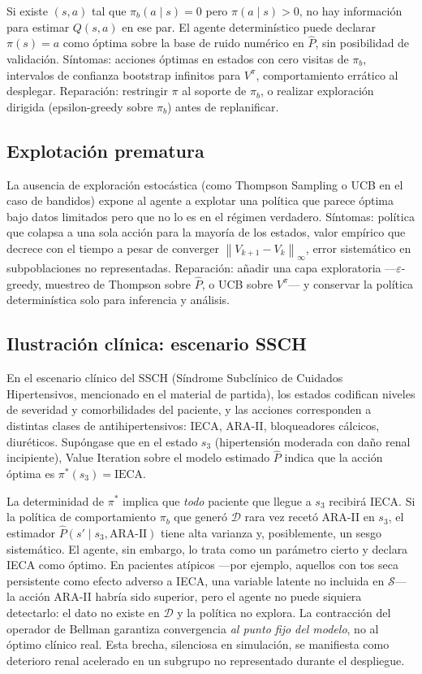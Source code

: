 \documentclass[12pt, a4paper]{article}
\theoremstyle{plain}
\theoremstyle{definition}
\newcommand{\cS}{\mathcal{S}}
\newcommand{\Vpi}{V^{\pi}}
\newcommand{\norminf}[1]{\left\|#1\right\|_{\infty}}
\newcommand{\pibeh}{\pi_b}
\newcommand{\Phat}{\widehat{P}}
\begin{document}
Si existe $(s,a)$ tal que $\pibeh(a\mid s)=0$ pero $\pi(a\mid s)>0$,
no hay información para estimar $Q(s,a)$ en ese par. El agente
determinístico puede declarar $\pi(s)=a$ como óptima sobre la base de
ruido numérico en $\Phat$, sin posibilidad de validación. Síntomas:
acciones óptimas en estados con cero visitas de $\pibeh$, intervalos de
confianza bootstrap infinitos para $V^{\pi}$, comportamiento errático al
desplegar. Reparación: restringir $\pi$ al soporte de $\pibeh$, o
realizar exploración dirigida (epsilon-greedy sobre $\pibeh$) antes de
replanificar.

\subsection{Explotación prematura}

La ausencia de exploración estocástica (como Thompson Sampling o UCB en
el caso de bandidos) expone al agente a explotar una política que parece
óptima bajo datos limitados pero que no lo es en el régimen verdadero.
Síntomas: política que colapsa a una sola acción para la mayoría de los
estados, valor empírico que decrece con el tiempo a pesar de converger
$\norminf{V_{k+1}-V_k}$, error sistemático en subpoblaciones no
representadas. Reparación: añadir una capa exploratoria ---$\varepsilon$-greedy,
muestreo de Thompson sobre $\Phat$, o UCB sobre $\Vpi$--- y conservar la
política determinística solo para inferencia y análisis.

\subsection{Ilustración clínica: escenario SSCH}

En el escenario clínico del SSCH (Síndrome Subclínico de Cuidados
Hipertensivos, mencionado en el material de partida), los estados
codifican niveles de severidad y comorbilidades del paciente, y las
acciones corresponden a distintas clases de antihipertensivos: IECA,
ARA-II, bloqueadores cálcicos, diuréticos. Supóngase que en el estado
$s_3$ (hipertensión moderada con daño renal incipiente), Value Iteration
sobre el modelo estimado $\Phat$ indica que la acción óptima es
$\pi^{*}(s_3)=\text{IECA}$.

La determinidad de $\pi^{*}$ implica que \emph{todo} paciente que llegue a
$s_3$ recibirá IECA. Si la política de comportamiento $\pibeh$ que generó
$\mathcal{D}$ rara vez recetó ARA-II en $s_3$, el estimador
$\Phat(s'\mid s_3,\text{ARA-II})$ tiene alta varianza y, posiblemente, un
sesgo sistemático. El agente, sin embargo, lo trata como un parámetro
cierto y declara IECA como óptimo. En pacientes atípicos ---por ejemplo,
aquellos con tos seca persistente como efecto adverso a IECA, una
variable latente no incluida en $\cS$--- la acción ARA-II habría sido
superior, pero el agente no puede siquiera detectarlo: el dato no existe
en $\mathcal{D}$ y la política no explora. La contracción del operador de
Bellman garantiza convergencia \emph{al punto fijo del modelo}, no al
óptimo clínico real. Esta brecha, silenciosa en simulación, se manifiesta
como deterioro renal acelerado en un subgrupo no representado durante el
despliegue.
\end{document}
